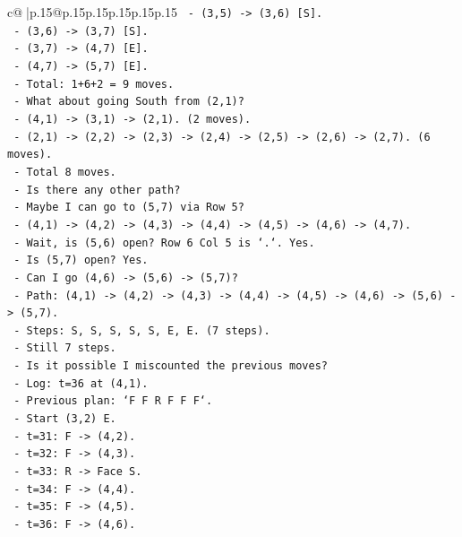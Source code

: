 \documentclass{article}
\begin{document}
{\begin{supertabular}{c@{$\;$}|p{.15\linewidth}@{}p{.15\linewidth}p{.15\linewidth}p{.15\linewidth}p{.15\linewidth}p{.15\linewidth}}
{{{\texttt{       {-} (3,5) {-}> (3,6) {[}S{]}.} \\
\texttt{       {-} (3,6) {-}> (3,7) {[}S{]}.} \\
\texttt{       {-} (3,7) {-}> (4,7) {[}E{]}.} \\
\texttt{       {-} (4,7) {-}> (5,7) {[}E{]}.} \\
\texttt{       {-} Total: 1+6+2 = 9 moves.} \\
\texttt{     {-} What about going South from (2,1)?} \\
\texttt{       {-} (4,1) {-}> (3,1) {-}> (2,1). (2 moves).} \\
\texttt{       {-} (2,1) {-}> (2,2) {-}> (2,3) {-}> (2,4) {-}> (2,5) {-}> (2,6) {-}> (2,7). (6 moves).} \\
\texttt{       {-} Total 8 moves.} \\
\texttt{     {-} Is there any other path?} \\
\texttt{       {-} Maybe I can go to (5,7) via Row 5?} \\
\texttt{       {-} (4,1) {-}> (4,2) {-}> (4,3) {-}> (4,4) {-}> (4,5) {-}> (4,6) {-}> (4,7).} \\
\texttt{       {-} Wait, is (5,6) open? Row 6 Col 5 is `.`. Yes.} \\
\texttt{       {-} Is (5,7) open? Yes.} \\
\texttt{       {-} Can I go (4,6) {-}> (5,6) {-}> (5,7)?} \\
\texttt{       {-} Path: (4,1) {-}> (4,2) {-}> (4,3) {-}> (4,4) {-}> (4,5) {-}> (4,6) {-}> (5,6) {-}> (5,7).} \\
\texttt{       {-} Steps: S, S, S, S, S, E, E. (7 steps).} \\
\texttt{       {-} Still 7 steps.} \\
\texttt{   {-} Is it possible I miscounted the previous moves?} \\
\texttt{     {-} Log: t=36 at (4,1).} \\
\texttt{     {-} Previous plan: `F F R F F F`.} \\
\texttt{     {-} Start (3,2) E.} \\
\texttt{     {-} t=31: F {-}> (4,2).} \\
\texttt{     {-} t=32: F {-}> (4,3).} \\
\texttt{     {-} t=33: R {-}> Face S.} \\
\texttt{     {-} t=34: F {-}> (4,4).} \\
\texttt{     {-} t=35: F {-}> (4,5).} \\
\texttt{     {-} t=36: F {-}> (4,6).} \\
}}}
\end{supertabular}}
\end{document}
